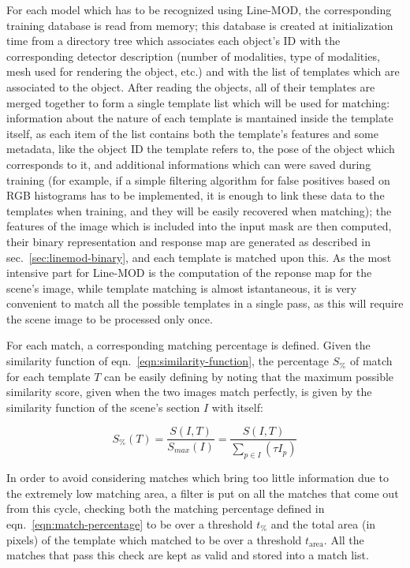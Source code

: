 For each model which has to be recognized using Line-MOD, the
corresponding training database is read from memory; this database
is created at initialization time from a directory tree which
associates each object's ID with the corresponding detector
description (number of modalities, type of modalities, mesh used for
rendering the object, etc.) and with the list of templates which are
associated to the object. After reading the objects, all of their
templates are merged together to form a single template list which
will be used for matching: information about the nature of each
template is mantained inside the template itself, as each item of the
list contains both the template's features and some metadata, like the
object ID the template refers to, the pose of the object which
corresponds to it, and additional informations which can were saved
during training (for example, if a simple filtering algorithm for false
positives  based on RGB histograms has to be implemented, it is enough
to link these data to the templates when training, and they will be
easily recovered when matching); the features of the image which is
included into the input mask are then computed, their binary
representation and response map are generated as described in
sec.~\ref{sec:linemod-binary}, and each template is matched upon
this. As the most intensive part for Line-MOD is the computation of
the reponse map for the scene's image, while template matching is
almost istantaneous, it is very convenient to match all the possible
templates in a single pass, as this will require the scene image to be
processed only once.

For each match, a corresponding matching percentage is defined. Given
the similarity function of eqn.~\ref{eqn:similarity-function}, the
percentage $S_\%$ of match for each template $T$ can be easily defining by noting
that the maximum possible similarity score, given when the two
images match perfectly, is given by the similarity function of the
scene's section $I$ with itself:

\begin{equation} \label{eqn:match-percentage}
  S_\%(T) = \frac{S(I,T)}{S_{max}(I)} = \frac{S(I,T)}{\sum_{p \in I}
    \left( \tau I_{p} \right)}
\end{equation}

In order to avoid considering matches which bring too little
information due to the extremely low matching area, a filter is put on
all the matches that come out from this cycle, checking both the
matching percentage defined in eqn.~\ref{eqn:match-percentage} to be over
a threshold $t_\%$ and the total area (in pixels) of the template
which matched to be over a threshold $t_{\text{area}}$. All the
matches that pass this check are kept as valid and stored into a
match list.

